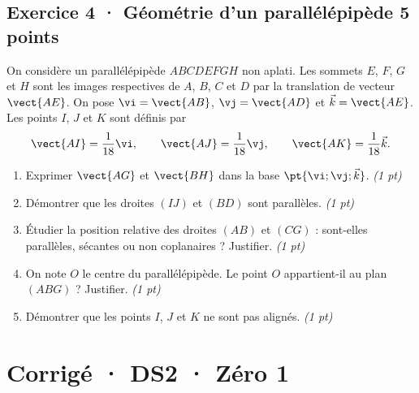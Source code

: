 \subsection*{Exercice 4 · Géométrie d'un parallélépipède \hfill 5 points}On considère un parallélépipède $ABCDEFGH$ non aplati. Les sommets $E$, $F$, $G$ et $H$ sont les images respectives de $A$, $B$, $C$ et $D$ par la translation de vecteur $\vect{AE}$.
On pose $\vi=\vect{AB}$, $\vj=\vect{AD}$ et $\vec k=\vect{AE}$.
Les points $I$, $J$ et $K$ sont définis par
\[\vect{AI}=\frac1{18}\vi,\qquad\vect{AJ}=\frac1{18}\vj,\qquad\vect{AK}=\frac1{18}\vec k.\]

\begin{enumerate}

\item Exprimer $\vect{AG}$ et $\vect{BH}$ dans la base $\pt{\vi;\vj;\vec k}$. \hfill\textit{(1 pt)}

\item Démontrer que les droites $(IJ)$ et $(BD)$ sont parallèles. \hfill\textit{(1 pt)}

\item Étudier la position relative des droites $(AB)$ et $(CG)$ : sont-elles parallèles, sécantes ou non coplanaires ? Justifier. \hfill\textit{(1 pt)}

\item On note $O$ le centre du parallélépipède. Le point $O$ appartient-il au plan $(ABG)$ ? Justifier. \hfill\textit{(1 pt)}

\item Démontrer que les points $I$, $J$ et $K$ ne sont pas alignés. \hfill\textit{(1 pt)}

\end{enumerate}

\ifmxteacher\mxnewpage

\section*{Corrigé · DS2 · Zéro 1}\label{cor:2-1}

